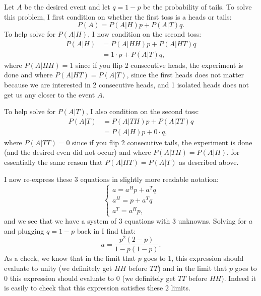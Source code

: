 \begin{problem}{3} Let $A$ be the desired event and let $q=1-p$ be the probability of tails.  To solve this problem, I first condition on whether the first toss is a heads or tails:
\begin{equation*}
P(A) = P(A|H)p+P(A|T)q.
\end{equation*}
To help solve for $P(A|H)$, I now condition on the second toss:
\begin{align*}
P(A|H) &= P(A|HH)p+P(A|HT)q \\
&= 1\cdot p+P(A|T)q,
\end{align*}
where $P(A|HH) =1$ since if you flip 2 consecutive heads, the experiment is done and where $P(A|HT) = P(A|T)$, since the first heads does not matter because we are interested in 2 consecutive heads, and 1 isolated heads does not get us any closer to the event $A$.

To help solve for $P(A|T)$, I also condition on the second toss:
\begin{align*}
P(A|T) &= P(A|TH)p+P(A|TT)q \\
&= P(A|H)p +0\cdot q,
\end{align*}
where $P(A|TT) =0$ since if you flip 2 consecutive tails, the experiment is done (and the desired even did not occur) and where $P(A|TH) = P(A|H)$, for essentially the same reason that $P(A|HT) = P(A|T)$ as described above.

I now re-express these 3 equations in slightly more readable notation:
 \[
\left\{
                \begin{array}{ll}
                 a= a^H p +a^Tq\\[10pt]
                 a^H= p +a^Tq\\[10pt]
                  a^T= a^H p,
                \end{array}
              \right.
  \]
and we see that we have a system of 3 equations with 3 unknowns.  Solving for $a$ and plugging $q=1-p$ back in I find that:
\begin{equation*}
a = \frac{p^2(2-p)}{1-p(1-p)}.
\end{equation*}
As a check, we know that in the limit that $p$ goes to 1, this expression should evaluate to unity (we definitely get $HH$ before $TT$) and in the limit that $p$ goes to 0 this expression should evaluate to 0 (we definitely get $TT$ before $HH$).  Indeed it is easily to check that this expression satisfies these 2 limits.

\end{problem}


